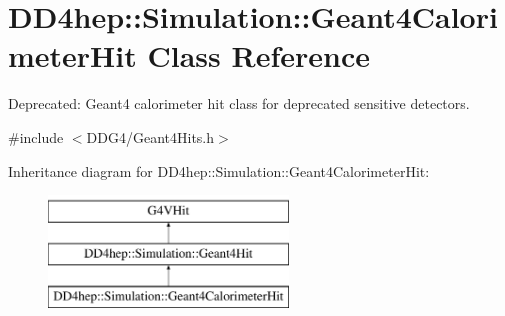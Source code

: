 \hypertarget{class_d_d4hep_1_1_simulation_1_1_geant4_calorimeter_hit}{}\section{D\+D4hep\+:\+:Simulation\+:\+:Geant4\+Calorimeter\+Hit Class Reference}
\label{class_d_d4hep_1_1_simulation_1_1_geant4_calorimeter_hit}


Deprecated\+: Geant4 calorimeter hit class for deprecated sensitive detectors.  




{\ttfamily \#include $<$D\+D\+G4/\+Geant4\+Hits.\+h$>$}

Inheritance diagram for D\+D4hep\+:\+:Simulation\+:\+:Geant4\+Calorimeter\+Hit\+:\begin{figure}[H]
\begin{center}
\leavevmode
\includegraphics[height=3.000000cm]{class_d_d4hep_1_1_simulation_1_1_geant4_calorimeter_hit}
\end{center}
\end{figure}

